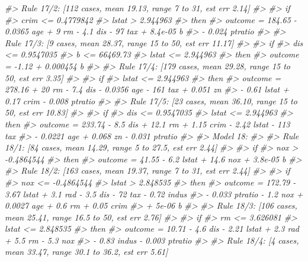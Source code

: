\documentclass[]{book}
\newenvironment{Shaded}{\begin{snugshade}}{\end{snugshade}}
\newcommand{\CommentTok}[1]{\textcolor[rgb]{0.56,0.35,0.01}{\textit{#1}}}
\begin{document}
\begin{Shaded}
\begin{Highlighting}[]
\CommentTok{#>   Rule 17/2: [112 cases, mean 19.13, range 7 to 31, est err 2.14]}
\CommentTok{#> }
\CommentTok{#>     if}
\CommentTok{#>  crim <= 0.4779842}
\CommentTok{#>  lstat > 2.944963}
\CommentTok{#>     then}
\CommentTok{#>  outcome = 184.65 - 0.0365 age + 9 rm - 4.1 dis - 97 tax + 8.4e-05 b}
\CommentTok{#>            - 0.024 ptratio}
\CommentTok{#> }
\CommentTok{#>   Rule 17/3: [9 cases, mean 28.37, range 15 to 50, est err 11.17]}
\CommentTok{#> }
\CommentTok{#>     if}
\CommentTok{#>  dis <= 0.9547035}
\CommentTok{#>  b <= 66469.73}
\CommentTok{#>  lstat <= 2.944963}
\CommentTok{#>     then}
\CommentTok{#>  outcome = -1.12 + 0.000454 b}
\CommentTok{#> }
\CommentTok{#>   Rule 17/4: [179 cases, mean 29.28, range 15 to 50, est err 3.35]}
\CommentTok{#> }
\CommentTok{#>     if}
\CommentTok{#>  lstat <= 2.944963}
\CommentTok{#>     then}
\CommentTok{#>  outcome = 278.16 + 20 rm - 7.4 dis - 0.0356 age - 161 tax + 0.051 zn}
\CommentTok{#>            - 0.61 lstat + 0.17 crim - 0.008 ptratio}
\CommentTok{#> }
\CommentTok{#>   Rule 17/5: [23 cases, mean 36.10, range 15 to 50, est err 10.83]}
\CommentTok{#> }
\CommentTok{#>     if}
\CommentTok{#>  dis <= 0.9547035}
\CommentTok{#>  lstat <= 2.944963}
\CommentTok{#>     then}
\CommentTok{#>  outcome = 233.74 - 8.5 dis + 12.1 rm + 1.15 crim - 2.42 lstat - 113 tax}
\CommentTok{#>            - 0.0221 age + 0.068 zn - 0.031 ptratio}
\CommentTok{#> }
\CommentTok{#> Model 18:}
\CommentTok{#> }
\CommentTok{#>   Rule 18/1: [84 cases, mean 14.29, range 5 to 27.5, est err 2.44]}
\CommentTok{#> }
\CommentTok{#>     if}
\CommentTok{#>  nox > -0.4864544}
\CommentTok{#>     then}
\CommentTok{#>  outcome = 41.55 - 6.2 lstat + 14.6 nox + 3.8e-05 b}
\CommentTok{#> }
\CommentTok{#>   Rule 18/2: [163 cases, mean 19.37, range 7 to 31, est err 2.44]}
\CommentTok{#> }
\CommentTok{#>     if}
\CommentTok{#>  nox <= -0.4864544}
\CommentTok{#>  lstat > 2.848535}
\CommentTok{#>     then}
\CommentTok{#>  outcome = 172.79 - 3.67 lstat + 3.1 rad - 3.5 dis - 72 tax - 0.72 indus}
\CommentTok{#>            - 0.033 ptratio - 1.2 nox + 0.0027 age + 0.6 rm + 0.05 crim}
\CommentTok{#>            + 5e-06 b}
\CommentTok{#> }
\CommentTok{#>   Rule 18/3: [106 cases, mean 25.41, range 16.5 to 50, est err 2.76]}
\CommentTok{#> }
\CommentTok{#>     if}
\CommentTok{#>  rm <= 3.626081}
\CommentTok{#>  lstat <= 2.848535}
\CommentTok{#>     then}
\CommentTok{#>  outcome = 10.71 - 4.6 dis - 2.21 lstat + 2.3 rad + 5.5 rm - 5.3 nox}
\CommentTok{#>            - 0.83 indus - 0.003 ptratio}
\CommentTok{#> }
\CommentTok{#>   Rule 18/4: [4 cases, mean 33.47, range 30.1 to 36.2, est err 5.61]}

\end{Highlighting}
\end{Shaded}
\end{document}
